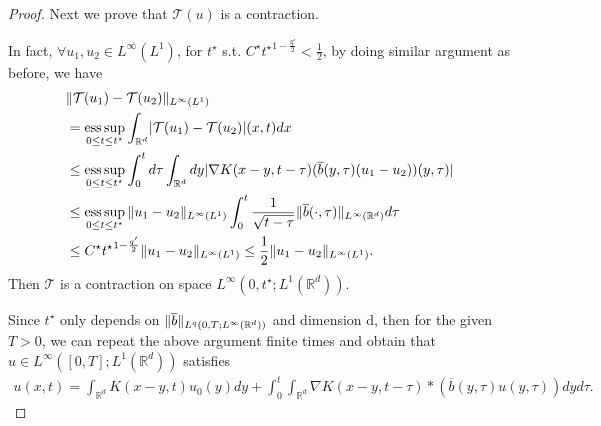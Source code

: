\begin{proof}
  \vskip3mm
  Next we prove that $\mathcal{T}(u)$ is a contraction. 
  
  In fact, $\forall  u_{1},u_{2} \in  L^{\infty}(L^{1} ) $, for $t^{\star }$ s.t. $ C^\star {t^\star}^{1-\frac{q'}{2}}< \frac{1}{2} $, by doing similar argument as before, we have
  \begin{align*}
    &\|\mathcal{T}(u_{1}) - \mathcal{T}(u_{2})\|_{L^{\infty}(L^{1} ) } \\
    &= \operatorname*{ess\,sup}_{0\le t\le t^{\star} }\int_{\mathbb{R}^{d} } \lvert\mathcal{T}(u_{1}) - \mathcal{T}(u_{2})\rvert(x,t)dx \\
    &\le  \operatorname*{ess\,sup}_{0\le t\le t^{\star} } \int_0^{t} d\tau  \int_{\mathbb{R}^{d} } dy \lvert\nabla K(x-y,t-\tau )(\overline{b}(y,\tau )(u_{1}-u_{2}) )(y,\tau ) \rvert\\
    &\le \operatorname*{ess\,sup}_{0\le t\le t^{\star} }  \|u_{1}-u_{2}\|_{L^{\infty}(L^{1} ) } \int_0^{t}  \frac{1}{\sqrt{t-\tau} }\|\overline{b} (\cdot,\tau)\|_{L^{\infty}(\mathbb{R}^d) } d\tau  \\
    &\le C^\star {t^\star}^{1-\frac{q'}{2}} \|u_{1}-u_{2}\|_{L^{\infty}(L^{1} ) }\leq \frac12  \|u_{1}-u_{2}\|_{L^{\infty}(L^{1} ) }
  .\end{align*}
  Then  $\mathcal{T}$ is a contraction on space $L^{\infty} (0,t^\star;L^{1}(\mathbb{R}^{d} ) ).$
  
  
  Since $t^{\star }$ only depends on $\|\overline{b} \|_{L^q(0,T;L^{\infty}(\mathbb{R}^d))}$ and dimension d, then for the given $T>0$, we can repeat the above argument finite times and obtain that  $ u \in  L^{\infty} ([0,T];L^{1}(\mathbb{R}^{d} ) )$ satisfies
  \begin{align*}
u(x,t) = \int_{\mathbb{R}^{d} }K(x-y,t)u_{0}(y) dy  + \int_{0}^{t} \int_{\mathbb{R}^{d} } \nabla K(x-y,t-\tau ) * (\overline{b}(y,\tau )u(y,\tau ) ) dy d\tau 
  .\end{align*}
\end{proof}


